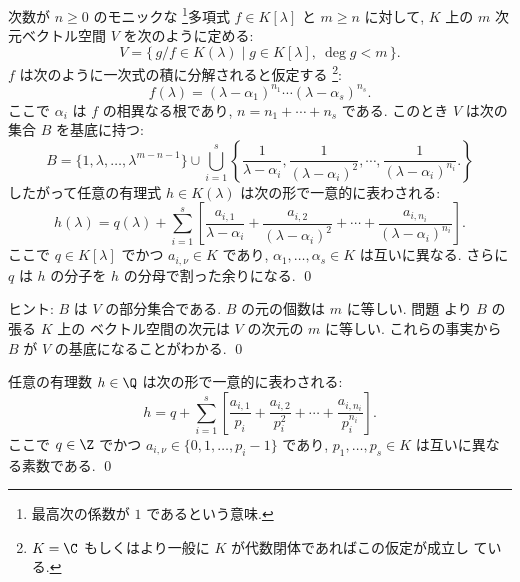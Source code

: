 \documentclass[12pt,twoside]{jarticle}
\begin{document}
\begin{question}[有理函数の部分分数展開]
\label{q:partial-fraction-2}
  次数が $n\ge0$ のモニックな%
  \footnote{最高次の係数が $1$ であるという意味.}多項式 $f\in K[\lambda]$ 
  と $m\ge n$ に対して, $K$ 上の $m$ 次元ベクトル空間 $V$ を次のように定める:
  \begin{equation*}
    V = \{\, g/f \in K(\lambda) \mid g\in K[\lambda],\ \deg g < m\,\}.
  \end{equation*}
  $f$ は次のように一次式の積に分解されると仮定する%
  \footnote{$K=\C$ もしくはより一般に $K$ が代数閉体であればこの仮定が成立し
    ている.}:
  \begin{equation*}
    f(\lambda) = (\lambda-\alpha_1)^{n_1}\cdots(\lambda-\alpha_s)^{n_s}.
  \end{equation*}
  ここで $\alpha_i$ は $f$ の相異なる根であり, $n=n_1+\cdots+n_s$ である.
  このとき $V$ は次の集合 $B$ を基底に持つ: 
  \begin{equation*}
    B = 
    \{1,\lambda,\dots,\lambda^{m-n-1}\}
    \cup
    \bigcup_{i=1}^s
    \left\{
      \frac{1}{\lambda-\alpha_i},
      \frac{1}{(\lambda-\alpha_i)^2},
      \cdots,
      \frac{1}{(\lambda-\alpha_i)^{n_i}}.
    \right\}
  \end{equation*}
  したがって任意の有理式 $h\in K(\lambda)$ は次の形で一意的に表わされる:
  \begin{equation*}
    h(\lambda)
    = q(\lambda) 
    + \sum_{i=1}^s
    \left[
      \frac{a_{i,1}}{\lambda-\alpha_i} +
      \frac{a_{i,2}}{(\lambda-\alpha_i)^2} + \cdots +
      \frac{a_{i,n_i}}{(\lambda-\alpha_i)^{n_i}}
    \right].
  \end{equation*}
  ここで $q\in K[\lambda]$ でかつ $a_{i,\nu}\in K$ であり,
  $\alpha_1,\dots,\alpha_s\in K$ は互いに異なる.
  さらに $q$ は $h$ の分子を $h$ の分母で割った余りになる.
  \qed
\end{question}

\noindent
ヒント: $B$ は $V$ の部分集合である.
$B$ の元の個数は $m$ に等しい.
問題  より $B$ の張る $K$ 上の
ベクトル空間の次元は $V$ の次元の $m$ に等しい.
これらの事実から $B$ が $V$ の基底になることがわかる.
\qed


\begin{question}[有理数の部分分数展開]
\label{q:partial-fraction-2-Z}
  任意の有理数 $h\in\Q$ は次の形で一意的に表わされる:
  \begin{equation*}
    h
    = q
    + \sum_{i=1}^s
    \left[
      \frac{a_{i,1}}{p_i} +
      \frac{a_{i,2}}{p_i^2} + \cdots +
      \frac{a_{i,n_i}}{p_i^{n_i}}
    \right].
  \end{equation*}
  ここで $q\in\Z$ でかつ $a_{i,\nu}\in \{0,1,\dots,p_i-1\}$ であり, 
  $p_1,\dots,p_s\in K$ は互いに異なる素数である.
  \qed  
\end{question}
\end{document}
